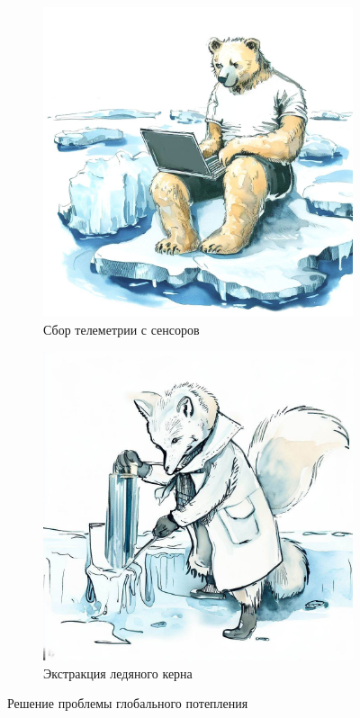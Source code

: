 \documentclass[a5paper,11pt]{memoir}
\begin{document}
\begin{figure}[t]
  \begin{subfigure}{.5\paperwidth}
    \centering
    \includegraphics[width=.8\linewidth]{images/bear-laptop.jpg}
    \caption{Сбор телеметрии с сенсоров}
  \end{subfigure}%
  \begin{subfigure}{.5\paperwidth}
    \centering
    \includegraphics[width=.8\linewidth]{images/fox-ice-core.jpg}
    \caption{Экстракция ледяного керна}
  \end{subfigure}
  \caption{Решение проблемы глобального потепления}
\end{figure}
\end{document}
